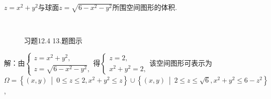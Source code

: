 \documentclass[12pt,UTF8]{ctexart}
\newcommand\Set[2]{\left\{#1\ \middle\vert\ #2 \right\}}
\begin{document}
\begin{enumerate}
$z=x^2+y^2$与球面$z=\sqrt{6-x^2-y^2}$所围空间图形的体积.

\begin{figure}[H]
\begin{center}
\\
\end{center}
\caption{习题12.4 13.题图示}
\label{12-4-13}
\end{figure}

解：由$\begin{cases}
z=x^2+y^2,\\
z=\sqrt{6-x^2-y^2},
\end{cases}$得$\begin{cases}
z=2,\\
x^2+y^2=2,
\end{cases}$该空间图形可表示为\\
$\Omega=\Set{(x,y)}{0\leqslant z\leqslant2,x^2+y^2\leqslant z}\cup\Set{(x,y)}{2\leqslant z\leqslant\sqrt6,x^2+y^2\leqslant6-z^2}$,


\end{enumerate}
\end{document}
